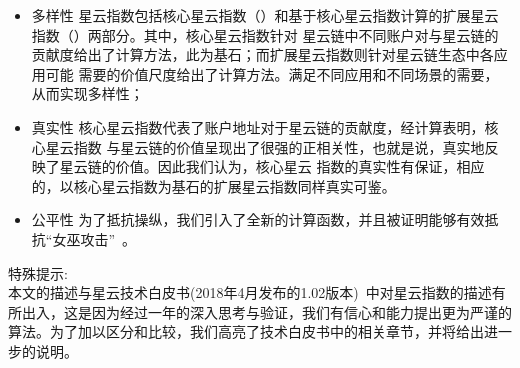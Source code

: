 \begin{itemize}
\item{多样性} 星云指数包括核心星云指数（\nrcore）和基于核心星云指数计算的扩展星云指数（\nrext）两部分。其中，核心星云指数针对
星云链中不同账户对与星云链的贡献度给出了计算方法，此为基石；而扩展星云指数则针对星云链生态中各应用可能
需要的价值尺度给出了计算方法。满足不同应用和不同场景的需要，从而实现多样性；
\item{真实性} 核心星云指数代表了账户地址对于星云链的贡献度，经计算表明，核心星云指数
与星云链的价值呈现出了很强的正相关性，也就是说，真实地反映了星云链的价值。因此我们认为，核心星云
指数的真实性有保证，相应的，以核心星云指数为基石的扩展星云指数同样真实可鉴。
\item{公平性} 为了抵抗操纵，我们引入了全新的计算函数，并且被证明能够有效抵抗“女巫攻击”~\cite{cheng2005sybilproof}。%
\end{itemize}

\noindent 特殊提示:\\
本文的描述与星云技术白皮书(2018年4月发布的1.02版本)~\cite{Nabulas}中对星云指数的描述有所出入，这是因为经过一年的深入思考与验证，我们有信心和能力提出更为严谨的算法。为了加以区分和比较，我们高亮了技术白皮书中的相关章节，并将给出进一步的说明。

